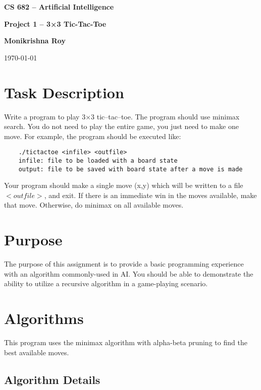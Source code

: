 \documentclass[twoside,10pt]{article}
\begin{document}
\begin{center}
    {\Large \bf CS 682 – Artificial Intelligence}

    \vspace{.5cm}

    {\Large \bf Project 1 – 3×3 Tic-Tac-Toe}

    \vspace{0.5cm}
    {\large \bf Monikrishna Roy}
    \vspace{0.5cm}

    {\large \today}


\end{center}

\section*{Task Description}
Write a program to play 3×3 tic–tac–toe. The program should use minimax search. You do not need to play the entire game, you just need to make one move. For example, the program should be executed like:

\begin{verbatim}    
    ./tictactoe <infile> <outfile>
    infile: file to be loaded with a board state
    output: file to be saved with board state after a move is made
\end{verbatim}

Your program should make a single move (x,y) which will be written to a file $<outfile>$, and exit. If there is an immediate win in the moves available, make that move. Otherwise, do minimax on all available moves.

\section*{Purpose}

The purpose of this assignment is to provide a basic programming experience with an algorithm commonly-used in AI. You should be able to demonstrate the ability to utilize a recursive algorithm in a game-playing scenario.

\section*{Algorithms}

This program uses the minimax algorithm with alpha-beta pruning to find the best available moves.

\subsection*{Algorithm Details}
\end{document}
